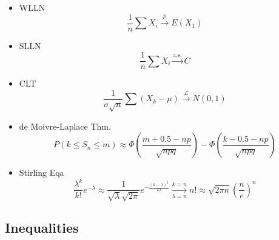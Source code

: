\begin{itemize}
    \item WLLN
\begin{equation}    \frac{1}{n}\sum X_i\xrightarrow[]{p} E(X_1)
\end{equation}
\item SLLN
\begin{equation}    \frac{1}{n}\sum X_i\xrightarrow[]{\text{a.s.}}  C
\end{equation}
\item CLT
\begin{equation}    \frac{1}{\sigma\sqrt{n}}\sum(X_k-\mu)\xrightarrow[]{\mathscr{L}} N(0,1)
\end{equation}
\item de Moivre-Laplace Thm.
\begin{equation}    P(k\leq S_n\leq m)\approx \Phi(\frac{m+0.5-np}{\sqrt{npq}})-\Phi(\frac{k-0.5-np}{\sqrt{npq}})
\end{equation}
\item Stirling Eqa
\begin{equation}    \frac{\lambda^k}{k!}e^{-\lambda}\approx \frac{1}{\sqrt{\lambda}\sqrt{2\pi}}e^{-\frac{(k-\lambda)^2}{2\lambda}}\xrightarrow[\lambda=n]{k=n}n!\approx\sqrt{2\pi n}(\frac{n}{e})^n
\end{equation}

\end{itemize}


\subsection{Inequalities}
    

